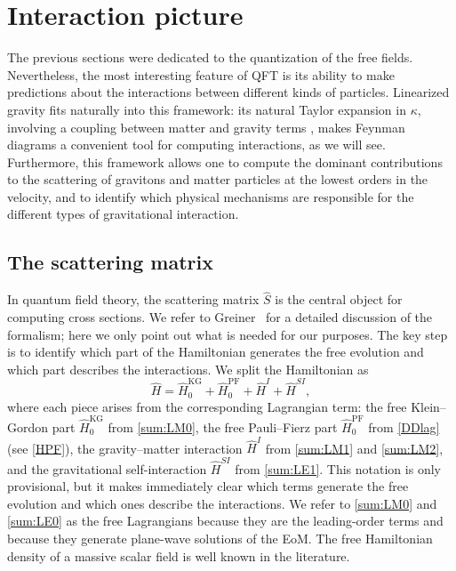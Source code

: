 \documentclass[12pt,a4paper,oneside]{article}
\numberwithin{equation}{section}   %
\begin{document}
\newpage
\section{Interaction picture}
The previous sections were dedicated to the quantization of the free fields.
Nevertheless, the most interesting feature of QFT is its ability to make
predictions about the interactions between different kinds of particles.
Linearized gravity fits naturally into this framework: its
natural Taylor expansion in $\kappa$, 
involving a coupling between matter and gravity terms
, makes Feynman diagrams a convenient tool for
computing interactions, as we will see.
Furthermore, this framework allows one to compute the dominant contributions to
the scattering of gravitons and matter particles at the lowest orders in the
velocity, and to identify which physical mechanisms are responsible for the
different types of gravitational interaction.

\subsection{The scattering matrix}
In quantum field theory, the scattering matrix $\hat S$ is the central object
for computing cross sections. We refer to Greiner~\cite{GreinerFQ} for a detailed discussion of
the formalism; here we only point out what is needed for our purposes.
The key step is to identify which part of the Hamiltonian generates the free
evolution and which part describes the interactions. We split the Hamiltonian as
\begin{equation}
\hat{H} = \hat{H}_0^{\mathrm{KG}} + \hat{H}_0^{\mathrm{PF}} + \hat{H}^{I} + \hat{H}^{SI},
\label{eq:Htot}
\end{equation}
where each piece arises from the corresponding Lagrangian term: the free
Klein--Gordon part $\hat H_0^{\mathrm{KG}}$ from \eqref{sum:LM0}, the free
Pauli--Fierz part $\hat H_0^{\mathrm{PF}}$ from \eqref{DDlag} (see \eqref{HPF}),
the gravity--matter interaction $\hat H^{I}$ from \eqref{sum:LM1} and
\eqref{sum:LM2}, and the gravitational self-interaction $\hat H^{SI}$ from
\eqref{sum:LE1}. This notation is only provisional, but it makes immediately
clear which terms generate the free evolution and which ones describe the
interactions. We refer to \eqref{sum:LM0} and \eqref{sum:LE0} as the free
Lagrangians because they are the leading-order terms and because they generate
plane-wave solutions of the EoM. The free Hamiltonian density of a massive
scalar field is well known in the literature.
\end{document}
